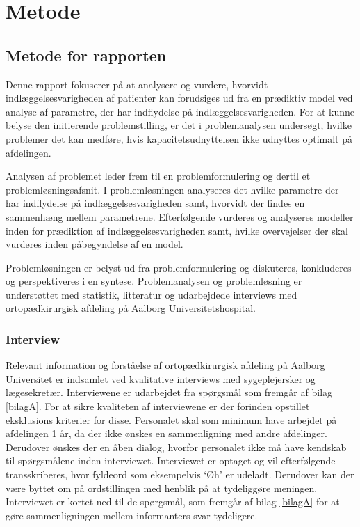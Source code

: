 \chapter*{Metode}
\section*{Metode for rapporten}
Denne rapport fokuserer på at analysere og vurdere, hvorvidt indlæggelsesvarigheden af patienter kan forudsiges ud fra en prædiktiv model ved analyse af parametre, der har indflydelse på indlæggelsesvarigheden. For at kunne belyse den initierende problemstilling, er det i problemanalysen undersøgt, hvilke problemer det kan medføre, hvis kapacitetsudnyttelsen ikke udnyttes optimalt på afdelingen. %

Analysen af problemet leder frem til en problemformulering og dertil et problemløsningsafsnit. I problemløsningen analyseres det hvilke parametre der har indflydelse på indlæggelsesvarigheden samt, hvorvidt der findes en sammenhæng mellem parametrene. Efterfølgende vurderes og analyseres modeller inden for prædiktion af indlæggelsesvarigheden samt, hvilke overvejelser der skal vurderes inden påbegyndelse af en model. 


Problemløsningen er belyst ud fra problemformulering og diskuteres, konkluderes og perspektiveres i en syntese. Problemanalysen og problemløsning er understøttet med statistik, litteratur og udarbejdede interviews med ortopædkirurgisk afdeling på Aalborg Universitetshospital.


\subsection*{Interview}
Relevant information og forståelse af ortopædkirurgisk afdeling på Aalborg Universitet er indsamlet ved kvalitative interviews med sygeplejersker og lægesekretær. Interviewene er udarbejdet fra spørgsmål som fremgår af bilag \ref{bilagA}. For at sikre kvaliteten af interviewene er der forinden opstillet eksklusions kriterier for disse. Personalet skal som minimum have arbejdet på afdelingen 1 år, da der ikke ønskes en sammenligning med andre afdelinger. Derudover ønskes der en åben dialog, hvorfor personalet ikke må have kendskab til spørgsmålene inden interviewet. Interviewet er optaget og vil efterfølgende transskriberes, hvor fyldeord som eksempelvis ‘Øh’ er udeladt. Derudover kan der være byttet om på ordstillingen med henblik på at tydeliggøre meningen. Interviewet er kortet ned til de spørgsmål, som fremgår af bilag \ref{bilagA} for at gøre sammenligningen mellem informanters svar tydeligere.


